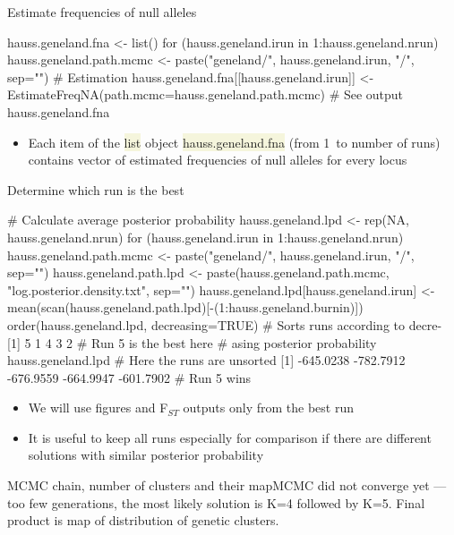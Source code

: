 \documentclass[compress, ucs, xelatex, 11pt, xcolor=svgnames, aspectratio=169,
	hyperref={
		bookmarks=true,
		unicode=true,
		colorlinks=true,
		pdftitle={Molecular data in R},
		plainpages=false,
		pdfauthor={Vojtech Zeisek},
		pdfsubject={Course about phylogeny and evolution in R},
		pdfcreator={XeLaTeX},
		pdfkeywords={R, evolution, phylogeny, molecular data},
		linkcolor=Crimson, %
		anchorcolor=Magenta, %
		citecolor=Magenta, %
		filecolor=Magenta, %
		menucolor=Magenta, %
		urlcolor=DodgerBlue, %
		pdftex},
	url={hyphens, lowtilde} %
	]{beamer}
\renewcommand{\texttt}[1]{\colorbox{Beige}{{\ttfamily #1}}}
\begin{document}
\begin{frame}[fragile]{Estimate frequencies of null alleles}
	\begin{spluscode}
    hauss.geneland.fna <- list()
    for (hauss.geneland.irun in 1:hauss.geneland.nrun) {
      hauss.geneland.path.mcmc <- paste("geneland/", hauss.geneland.irun,
        "/", sep="")
      # Estimation
      hauss.geneland.fna[[hauss.geneland.irun]] <-
        EstimateFreqNA(path.mcmc=hauss.geneland.path.mcmc)
      }
    # See output
    hauss.geneland.fna
	\end{spluscode}
	\begin{itemize}
		\item Each item of the \texttt{list} object \texttt{hauss.geneland.fna} (from 1~to number of runs) contains vector of estimated frequencies of null alleles for every locus
	\end{itemize}
\end{frame}

\begin{frame}[fragile]{Determine which run is the best}
	\begin{spluscode}
    # Calculate average posterior probability
    hauss.geneland.lpd <- rep(NA, hauss.geneland.nrun)
    for (hauss.geneland.irun in 1:hauss.geneland.nrun) {
      hauss.geneland.path.mcmc <- paste("geneland/", hauss.geneland.irun, "/",
        sep="")
      hauss.geneland.path.lpd <- paste(hauss.geneland.path.mcmc,
        "log.posterior.density.txt", sep="")
      hauss.geneland.lpd[hauss.geneland.irun] <-
        mean(scan(hauss.geneland.path.lpd)[-(1:hauss.geneland.burnin)]) }
    order(hauss.geneland.lpd, decreasing=TRUE) # Sorts runs according to decre-
    [1] 5 1 4 3 2 # Run 5 is the best here     # asing posterior probability
    hauss.geneland.lpd # Here the runs are unsorted
    [1] -645.0238 -782.7912 -676.9559 -664.9947 -601.7902 # Run 5 wins
	\end{spluscode}
	\begin{itemize}
		\item We will use figures and F$_{ST}$ outputs only from the best run
		\item It is useful to keep all runs especially for comparison if there are different solutions with similar posterior probability
	\end{itemize}
\end{frame}

\begin{frame}{MCMC chain, number of clusters and their map}{MCMC did not converge yet --- too few generations, the most likely solution is K=4 followed by K=5. Final product is map of distribution of genetic clusters.}
	\begin{center}
		\texttt{[image: geneland1.png]}
	\end{center}
\end{frame}
\end{document}
